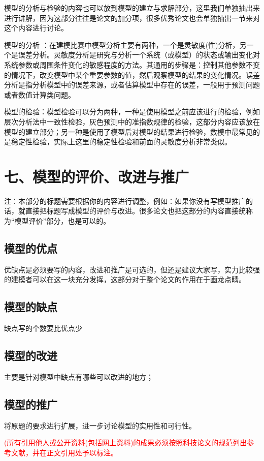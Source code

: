 \documentclass{my_paper}
\begin{document}
模型的分析与检验的内容也可以放到模型的建立与求解部分，这里我们单独抽出来进行讲解，因为这部分往往是论文的加分项，很多优秀论文也会单独抽出一节来对这个内容进行讨论。

模型的分析 ：在建模比赛中模型分析主要有两种，一个是灵敏度(性)分析，另一个是误差分析。灵敏度分析是研究与分析一个系统（或模型）的状态或输出变化对系统参数或周围条件变化的敏感程度的方法。其通用的步骤是：控制其他参数不变的情况下，改变模型中某个重要参数的值，然后观察模型的结果的变化情况。误差分析是指分析模型中的误差来源，或者估算模型中存在的误差，一般用于预测问题或者数值计算类问题。

模型的检验：模型检验可以分为两种，一种是使用模型之前应该进行的检验，例如层次分析法中一致性检验，灰色预测中的准指数规律的检验，这部分内容应该放在模型的建立部分；另一种是使用了模型后对模型的结果进行检验，数模中最常见的是稳定性检验，实际上这里的稳定性检验和前面的灵敏度分析非常类似。

\section{七、模型的评价、改进与推广}
注：本部分的标题需要根据你的内容进行调整，例如：如果你没有写模型推广的话，就直接把标题写成模型的评价与改进。很多论文也把这部分的内容直接统称为“模型评价”部分，也是可以的。

\subsection{模型的优点}
优缺点是必须要写的内容，改进和推广是可选的，但还是建议大家写，实力比较强的建模者可以在这一块充分发挥，这部分对于整个论文的作用在于画龙点睛。
\subsection{模型的缺点}
缺点写的个数要比优点少
\subsection{模型的改进}
主要是针对模型中缺点有哪些可以改进的地方\cite{risken1996fokker}；
\subsection{模型的推广}
将原题的要求进行扩展\cite{rossler1979equation}，进一步讨论模型的实用性和可行性\cite{mckean1970nagumo}。

\begin{center}
\end{center}
\textcolor{red}{(所有引用他人或公开资料(包括网上资料)的成果必须按照科技论文的规范列出参考文献，并在正文引用处予以标注。}
\end{document}
